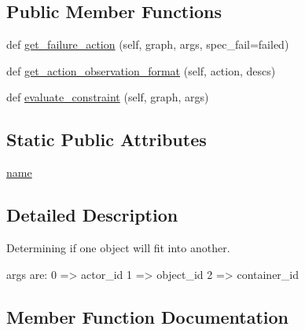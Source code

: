 \subsection*{Public Member Functions}
\begin{DoxyCompactItemize}
\item 
def \hyperlink{classlight__chats_1_1graph_1_1FitsConstraint_a41bb59f13bde75e990d25d86283f3afe}{get\+\_\+failure\+\_\+action} (self, graph, args, spec\+\_\+fail=\textquotesingle{}failed\textquotesingle{})
\item 
def \hyperlink{classlight__chats_1_1graph_1_1FitsConstraint_a1a14b78e6b28a764e7c7833315db2992}{get\+\_\+action\+\_\+observation\+\_\+format} (self, action, descs)
\item 
def \hyperlink{classlight__chats_1_1graph_1_1FitsConstraint_a56a590d425f4c64c228ce3aa03471ffc}{evaluate\+\_\+constraint} (self, graph, args)
\end{DoxyCompactItemize}
\subsection*{Static Public Attributes}
\begin{DoxyCompactItemize}
\item 
\hyperlink{classlight__chats_1_1graph_1_1FitsConstraint_a7de858979fc9366f1099b157151991b5}{name}
\end{DoxyCompactItemize}


\subsection{Detailed Description}
\begin{DoxyVerb}Determining if one object will fit into another.

args are:     0 => actor_id     1 => object_id     2 => container_id
\end{DoxyVerb}
 

\subsection{Member Function Documentation}
\mbox{\label{classlight__chats_1_1graph_1_1FitsConstraint_a56a590d425f4c64c228ce3aa03471ffc}} 
